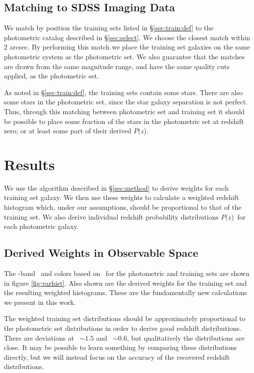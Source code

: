 \documentclass[preprint]{aastex}
\newcommand{\pofz}{$P(z$)}
\newcommand{\matchrad}{2 arcsec}
\begin{document}
\subsection{Matching to SDSS Imaging Data} \label{sec:train:match}

We match by position the training sets listed in \S \ref{sec:train:def} to the
photometric catalog described in \S \ref{sec:select}.  We choose the closest
match within \matchrad.  By performing this match we place the training set
galaxies on the same photometric system as the photometric set.  We also
guarantee that the matches are drawn from the same magnitude range, and
have the same quality cuts applied, as the photometric set.

As noted in \S \ref{sec:train:def}, the training sets contain some stars.
There are also some stars in the photometric set, since the star galaxy
separation is not perfect.  Thus, through this matching between photometric set
and training set it should be possible to place some fraction of the stars in
the photometric set at redshift zero; or at least some part of their derived
\pofz.

\section{Results}

We use the algorithm described in \S \ref{sec:method} to derive weights for
each training set galaxy.  We then use these weights to calculate a weighted
redshift histogram which, under our assumptions, should be proportional to that
of the training set.  We also derive individual redshift probability
distributions \pofz\ for each photometric galaxy.

\subsection{Derived Weights in Observable Space}

The \rmag-band \cmodelmag\ and colors based on \modelmag\ for the photometric
and training sets are shown in figure \ref{fig:varhist}.  Also shown are the
derived weights for the training set and the resulting weighted histograms.
These are the fundamentally new calculations we present in this work.

The weighted training set distributions should be approximately proportional to
the photometric set distributions in order to derive good redshift
distributions.  There are deviations at \gmr\ $\sim 1.5$ and \rmi\ $\sim 0.6$,
but qualitatively the distributions are close.  It may be possible to learn
something by comparing these distributions directly, but we will instead focus
on the accuracy of the recovered redshift distributions.
\end{document}
